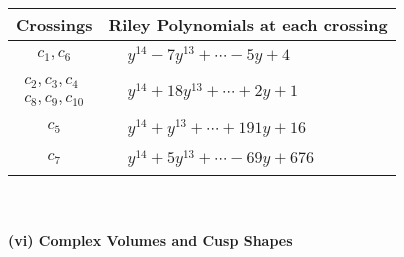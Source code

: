 \documentclass[1p]{elsarticle_modified}
\theoremstyle{definition}
\begin{document}
\begin{tabular}{m{50pt}|m{274pt}}
Crossings & \hspace{64pt}Riley Polynomials at each crossing \\
\hline $$\begin{aligned}c_{1},c_{6}\end{aligned}$$&$\begin{aligned}
&y^{14}-7 y^{13}+\cdots-5 y+4
\end{aligned}$\\
\hline $$\begin{aligned}c_{2},c_{3},c_{4}\\c_{8},c_{9},c_{10}\end{aligned}$$&$\begin{aligned}
&y^{14}+18 y^{13}+\cdots+2 y+1
\end{aligned}$\\
\hline $$\begin{aligned}c_{5}\end{aligned}$$&$\begin{aligned}
&y^{14}+y^{13}+\cdots+191 y+16
\end{aligned}$\\
\hline $$\begin{aligned}c_{7}\end{aligned}$$&$\begin{aligned}
&y^{14}+5 y^{13}+\cdots-69 y+676
\end{aligned}$\\
\hline
\end{tabular}\\~\\
\newpage\flushleft \textbf{(vi) Complex Volumes and Cusp Shapes}
\end{document}
